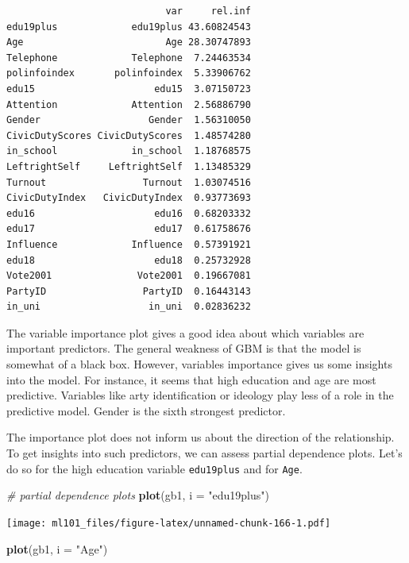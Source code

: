 \documentclass[]{article}
\newenvironment{Shaded}{\begin{snugshade}}{\end{snugshade}}
\newcommand{\CommentTok}[1]{\textcolor[rgb]{0.56,0.35,0.01}{\textit{#1}}}
\newcommand{\DataTypeTok}[1]{\textcolor[rgb]{0.13,0.29,0.53}{#1}}
\newcommand{\KeywordTok}[1]{\textcolor[rgb]{0.13,0.29,0.53}{\textbf{#1}}}
\newcommand{\NormalTok}[1]{#1}
\newcommand{\StringTok}[1]{\textcolor[rgb]{0.31,0.60,0.02}{#1}}
\begin{document}
\begin{verbatim}
                            var     rel.inf
edu19plus             edu19plus 43.60824543
Age                         Age 28.30747893
Telephone             Telephone  7.24463534
polinfoindex       polinfoindex  5.33906762
edu15                     edu15  3.07150723
Attention             Attention  2.56886790
Gender                   Gender  1.56310050
CivicDutyScores CivicDutyScores  1.48574280
in_school             in_school  1.18768575
LeftrightSelf     LeftrightSelf  1.13485329
Turnout                 Turnout  1.03074516
CivicDutyIndex   CivicDutyIndex  0.93773693
edu16                     edu16  0.68203332
edu17                     edu17  0.61758676
Influence             Influence  0.57391921
edu18                     edu18  0.25732928
Vote2001               Vote2001  0.19667081
PartyID                 PartyID  0.16443143
in_uni                   in_uni  0.02836232
\end{verbatim}

The variable importance plot gives a good idea about which variables are important predictors. The general weakness of GBM is that the model is somewhat of a black box. However, variables importance gives us some insights into the model. For instance, it seems that high education and age are most predictive. Variables like arty identification or ideology play less of a role in the predictive model. Gender is the sixth strongest predictor.

The importance plot does not inform us about the direction of the relationship. To get insights into such predictors, we can assess partial dependence plots. Let's do so for the high education variable \texttt{edu19plus} and for \texttt{Age}.

\begin{Shaded}
\begin{Highlighting}[]
\CommentTok{# partial dependence plots}
\KeywordTok{plot}\NormalTok{(gb1, }\DataTypeTok{i =} \StringTok{"edu19plus"}\NormalTok{)}
\end{Highlighting}
\end{Shaded}

\texttt{[image: ml101\_files/figure-latex/unnamed-chunk-166-1.pdf]}

\begin{Shaded}
\begin{Highlighting}[]
\KeywordTok{plot}\NormalTok{(gb1, }\DataTypeTok{i =} \StringTok{"Age"}\NormalTok{)}
\end{Highlighting}
\end{Shaded}
\end{document}
